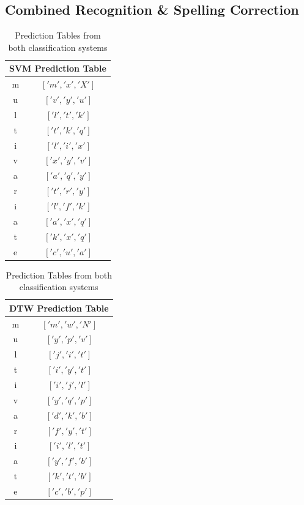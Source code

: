 \documentclass[12pt]{article}
\begin{document}
	\subsection{Combined Recognition \& Spelling Correction}
	\begin{table}[ht!]
	\begin{center}
		\begin{tabular}[l]{|c|c|}
	  \hline
	  \multicolumn{2}{|c|}{SVM Prediction Table}  \\
	  \hline
	  m & $['m', 'x', 'X']$  \\
	  u & $['v', 'y', 'u']$  \\
	  l & $['l', 't', 'k']$  \\
	  t & $['t', 'k', 'q']$  \\
	  i & $['l', 'i', 'x']$ \\
	  v & $['x', 'y', 'v']$  \\
	  a & $['a', 'q', 'y']$  \\
	  r & $['t', 'r', 'y']$  \\ 
		i & $['l', 'f', 'k']$  \\
	  a & $['a', 'x', 'q']$  \\ 
	  t & $['k', 'x', 'q']$  \\
	  e & $['c', 'u', 'a']$  \\
	  \hline
	\end{tabular}
	\quad
	\begin{tabular}[c]{|c|c|}
	  \hline
	  \multicolumn{2}{|c|}{DTW Prediction Table}  \\
	  \hline
	  m & $['m', 'w', 'N']$  \\
	  u & $['y', 'p', 'v']$  \\
	  l & $['j', 'i', 't']$  \\
	  t & $['i', 'y', 't']$  \\
	  i & $['i', 'j', 'l']$  \\
	  v & $['y', 'q', 'p']$  \\
	  a & $['d', 'k', 'b']$  \\
	  r & $['f', 'y', 't']$  \\ 
		i & $['i', 'l', 't']$  \\
	  a & $['y', 'f', 'b']$  \\ 
	  t & $['k', 't', 'b']$  \\
	  e & $['c', 'b', 'p']$  \\
	  \hline
	\end{tabular}
	\caption{Prediction Tables from both classification systems}
	\label{table:combined_svm_dtw}
	\end{center}
	\end{table}
	
\end{document}
